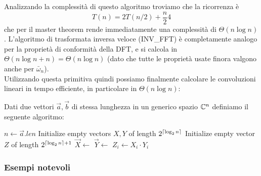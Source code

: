 \documentclass[11pt]{scrartcl}
\newcommand{\bigtheta}[1]{\Theta\!\left(#1\right)}
\begin{document}
	Analizzando la complessità di questo algoritmo troviamo che la ricorrenza è
	$$T(n)=2T(n/2)+\frac{n}{2}4$$
	che per il master theorem rende immediatamente una complessità di $\bigtheta{n\log n}$. L'algoritmo di trasformata inversa veloce (INV\_FFT) è completamente analogo per la proprietà di conformità della DFT, e si calcola in $\bigtheta{n\log n + n}=\bigtheta{n\log n}$ (dato che tutte le proprietà usate finora valgono anche per $\bar{\omega}_n$). \\
	Utilizzando questa primitiva quindi possiamo finalmente calcolare le convoluzioni lineari in tempo efficiente, in particolare in $\bigtheta{n\log n}$:
	\begin{algorithm}
		Dati due vettori $\vec{a},\vec{b}$ di stessa lunghezza in un generico spazio $\mathbb C^n$ definiamo il seguente algoritmo:
		\begin{algorithmic}[1]
				\State $n\gets \vec{a}.len$
				\State Initialize empty vectors $X,Y$ of length $2^{\left\lceil \log_2 n \right\rceil}$
				\State Initialize empty vector $Z$ of length $2^{\left\lceil \log_2 n \right\rceil+1}$
				\State $\vec{X}\gets $
				\State $\vec{Y}\gets $
					\State $Z_i\gets X_i\cdot Y_i$
				\EndFor
				\State \Return {}
			\EndFunction
		\end{algorithmic}
	\end{algorithm}
	
	\subsubsection{Esempi notevoli}
	
\end{document}

